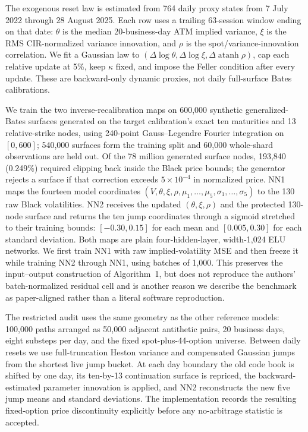 The exogenous reset law is estimated from 764 daily proxy states from 7 July
2022 through 28 August 2025.  Each row uses a trailing 63-session window ending
on that date: $\theta$ is the median 20-business-day ATM implied variance,
$\xi$ is the RMS CIR-normalized variance innovation, and $\rho$ is the
spot/variance-innovation correlation.  We fit a Gaussian law to
$(\Delta\log\theta,\Delta\log\xi,\Delta\operatorname{atanh}\rho)$, cap each
relative update at 5\%, keep $\kappa$ fixed, and impose the Feller condition
after every update.  These are backward-only dynamic proxies, not daily
full-surface Bates calibrations.

We train the two inverse-recalibration maps on 600,000 synthetic
generalized-Bates surfaces generated on the target calibration's exact ten
maturities and 13 relative-strike nodes, using 240-point Gauss--Legendre
Fourier integration on $[0,600]$; 540,000 surfaces form the training split and
60,000 whole-shard observations are held out.  Of the 78 million generated
surface nodes, 193,840 (0.249\%) required clipping back inside the Black price
bounds; the generator rejects a surface if that correction exceeds
$5\times10^{-4}$ in normalized price.  NN1 maps the fourteen
model coordinates $(V,\theta,\xi,\rho,\mu_1,\ldots,\mu_5,
\sigma_1,\ldots,\sigma_5)$ to the 130 raw Black volatilities.  NN2 receives
the updated $(\theta,\xi,\rho)$ and the protected 130-node surface and returns
the ten jump coordinates through a sigmoid stretched to their training
bounds: $[-0.30,0.15]$ for each mean and $[0.005,0.30]$ for each standard
deviation.  Both maps are plain four-hidden-layer, width-1,024 ELU networks.  We
first train NN1 with raw implied-volatility MSE and then freeze it while
training NN2 through NN1, using batches of 1,000.  This preserves the
input--output construction of Algorithm~1, but does not reproduce the
authors' batch-normalized residual cell and is another reason we describe the
benchmark as paper-aligned rather than a literal software reproduction.

The restricted audit uses the same geometry as the other reference models:
100,000 paths arranged as 50,000 adjacent antithetic pairs, 20 business days,
eight substeps per day, and the fixed spot-plus-44-option universe.  Between
daily resets we use full-truncation Heston variance and compensated Gaussian
jumps from the shortest live jump bucket.  At each day boundary the old
code book is shifted by one day, its ten-by-13 continuation surface is repriced,
the backward-estimated parameter innovation is applied, and NN2 reconstructs
the new five jump means and standard deviations.  The implementation records
the resulting fixed-option price discontinuity explicitly before any
no-arbitrage statistic is accepted.

